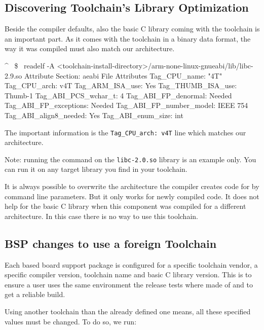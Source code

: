 \subsection{Discovering Toolchain's Library Optimization}

Beside the compiler defaults, also the basic C library coming with the toolchain
is an important part. As it comes with the toolchain in a binary data format,
the way it was compiled must also match our architecture.

\begin{ptxshell}[escapechar=~]{^}
~\$~ readelf -A <toolchain-install-directory>/arm-none-linux-gnueabi/lib/libc-2.9.so
Attribute Section: aeabi
File Attributes
  Tag_CPU_name: "4T"
  Tag_CPU_arch: v4T
  Tag_ARM_ISA_use: Yes
  Tag_THUMB_ISA_use: Thumb-1
  Tag_ABI_PCS_wchar_t: 4
  Tag_ABI_FP_denormal: Needed
  Tag_ABI_FP_exceptions: Needed
  Tag_ABI_FP_number_model: IEEE 754
  Tag_ABI_align8_needed: Yes
  Tag_ABI_enum_size: int
\end{ptxshell}

The important information is the \texttt{Tag\_CPU\_arch: v4T} line which matches
our architecture.

Note: running the command on the \texttt{libc-2.0.so} library is an example
only. You can run it on any target library you find in your toolchain.

\begin{important}
It is always possible to overwrite the architecture the compiler creates code
for by command line parameters. But it only works for newly compiled code. It
does not help for the basic C library when this component was compiled for a
different architecture. In this case there is no way to use this toolchain.
\end{important}

\subsection{BSP changes to use a foreign Toolchain}

Each \ptxdist{} based board support package is configured for a specific
toolchain vendor, a specific compiler version, toolchain name and basic C
library version. This is to ensure a user uses the same environment the release
tests where made of and to get a reliable build.

Using another toolchain than the already defined one means, all these
specified values must be changed. To do so, we run:

